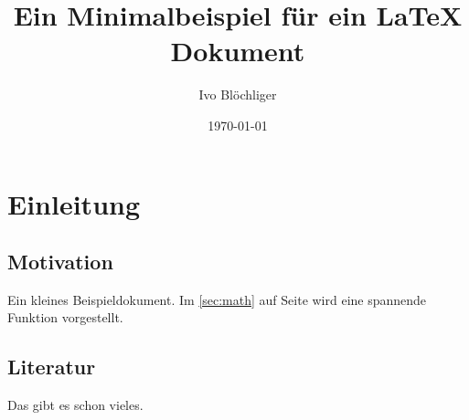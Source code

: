 \documentclass[a4paper,11pt]{report}
\title{Ein Minimalbeispiel für ein \LaTeX{} Dokument}
\author{Ivo Blöchliger}
\date{\today}
\begin{document}
\maketitle
\tableofcontents

\chapter{Einleitung}
\section{Motivation}
Ein kleines Beispieldokument. 
Im \autoref{sec:math} auf Seite \pageref{sec:math} 
wird eine spannende Funktion vorgestellt.
\section{Literatur}
Das gibt es schon vieles. 



\end{document}
